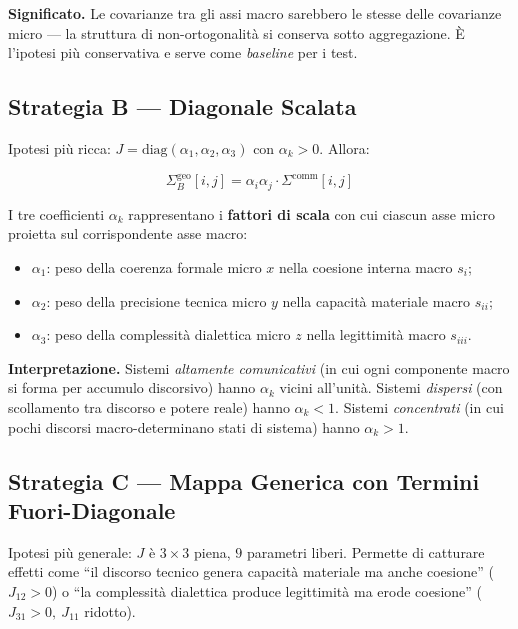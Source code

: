 \Hypoth{} \textbf{Significato.} Le covarianze tra gli assi macro
sarebbero le stesse delle covarianze micro --- la struttura di
non-ortogonalità si conserva sotto aggregazione. È l'ipotesi più
conservativa e serve come \emph{baseline} per i test.

\subsection{Strategia B --- Diagonale
Scalata}\label{strategia-b-diagonale-scalata}

Ipotesi più ricca: \(J = \text{diag}(\alpha_1, \alpha_2, \alpha_3)\) con
\(\alpha_k > 0\). Allora:

\[
\Sigma^{\text{geo}}_B[i,j] = \alpha_i \alpha_j \cdot \Sigma^{\text{comm}}[i,j]
\]

I tre coefficienti \(\alpha_k\) rappresentano i \textbf{fattori di
scala} con cui ciascun asse micro proietta sul corrispondente asse
macro:

\begin{itemize}
\tightlist
\item
  \(\alpha_1\): peso della coerenza formale micro \(x\) nella coesione
  interna macro \(s_i\);
\item
  \(\alpha_2\): peso della precisione tecnica micro \(y\) nella capacità
  materiale macro \(s_{ii}\);
\item
  \(\alpha_3\): peso della complessità dialettica micro \(z\) nella
  legittimità macro \(s_{iii}\).
\end{itemize}

\Hypoth{} \textbf{Interpretazione.} Sistemi \emph{altamente
comunicativi} (in cui ogni componente macro si forma per accumulo
discorsivo) hanno \(\alpha_k\) vicini all'unità. Sistemi \emph{dispersi}
(con scollamento tra discorso e potere reale) hanno \(\alpha_k < 1\).
Sistemi \emph{concentrati} (in cui pochi discorsi macro-determinano
stati di sistema) hanno \(\alpha_k > 1\).

\subsection{Strategia C --- Mappa Generica con Termini
Fuori-Diagonale}\label{strategia-c-mappa-generica-con-termini-fuori-diagonale}

Ipotesi più generale: \(J\) è \(3 \times 3\) piena, \(9\) parametri
liberi. Permette di catturare effetti come ``il discorso tecnico genera
capacità materiale ma anche coesione'' (\(J_{12} > 0\)) o ``la
complessità dialettica produce legittimità ma erode coesione''
(\(J_{31} > 0,\ J_{11}\) ridotto).

